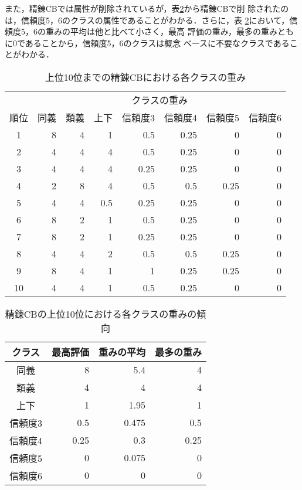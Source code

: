 また，精錬CBでは属性が削除されているが，表\ref{tb:clwei}から精錬CBで削
除されたのは，信頼度5，6のクラスの属性であることがわかる．さらに，表
\ref{tb:clwei}において，信頼度5，6の重みの平均は他と比べて小さく，最高
評価の重み，最多の重みともに0であることから，信頼度5，6のクラスは概念
ベースに不要なクラスであることがわかる．

\begin{table}[ht]
  \begin{center}
  \caption{上位10位までの精錬CBにおける各クラスの重み}
  \label{tb:wei_list}
    \begin{tabular}{c|rrrrrrr}
      \hline
      \multicolumn{1}{c|}{} & \multicolumn{7}{c}{クラスの重み} \\
      順位 &同義 & 類義 & 上下 & 信頼度3 & 信頼度4 & 信頼度5 & 信頼度6 \\
      \hline
      1 & 8 & 4 & 1 & 0.5 & 0.25 & 0 & 0 \\
      2 & 4 & 4 & 4 & 0.5 & 0.25 & 0 & 0 \\
      3 & 4 & 4 & 4 & 0.25 & 0.25 & 0 & 0 \\
      4 & 2 & 8 & 4 & 0.5 & 0.5 & 0.25 & 0 \\
      5 & 4 & 4 & 0.5 & 0.25 & 0.25 & 0 & 0 \\
      6 & 8 & 2 & 1 & 0.5 & 0.25 & 0 & 0 \\
      7 & 8 & 2 & 1 & 0.25 & 0.25 & 0 & 0 \\
      8 & 4 & 4 & 2 & 0.5 & 0.5 & 0.25 & 0 \\
      9 & 8 & 4 & 1 & 1 & 0.25 & 0.25 & 0 \\
      10 & 4 & 4 & 1 & 0.5 & 0.25 & 0 & 0 \\
      \hline
    \end{tabular}
  \end{center}
\end{table}

\begin{table}[ht]
  \begin{center}
    \caption{精錬CBの上位10位における各クラスの重みの傾向}
    \label{tb:clwei}
    \begin{tabular}{crrr}
      \hline
      クラス & 最高評価 & 重みの平均 & 最多の重み \\
      \hline
      同義 & 8 & 5.4 & 4 \\
      類義 & 4 & 4 & 4 \\
      上下 & 1 & 1.95 & 1 \\
      信頼度3 & 0.5 & 0.475 & 0.5 \\
      信頼度4 & 0.25 & 0.3 & 0.25 \\
      信頼度5 & 0 & 0.075 & 0 \\
      信頼度6 & 0 & 0 & 0 \\
      \hline
    \end{tabular}
  \end{center}
\end{table}

